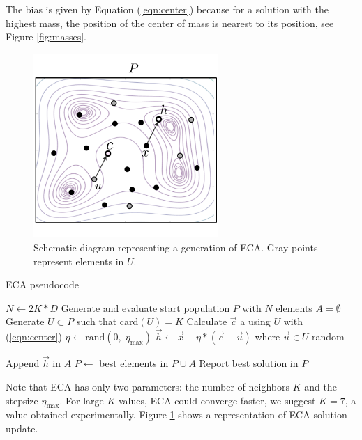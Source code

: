 \documentclass[graybox]{svmult}
\begin{document}
\begin{note}
The bias is given by Equation (\ref{eqn:center}) because for a solution 
with the highest mass, the position of the center of mass is nearest to 
its position, see Figure \ref{fig:masses}.
\end{note}

\begin{figure}[!ht]
	\sidecaption
	\includegraphics[width=7cm]{img/ecaG.pdf}
	\caption{Schematic diagram representing a generation of ECA. Gray points 
	represent elements in $U$.}
	\label{fig:ecag}       %
\end{figure}

\begin{algorithm}[!ht]
	\caption{ECA pseudocode}
	\label{algoritmoEca}
	\begin{algorithmic}[1]
		\State $N \gets 2K * D$
		\State Generate and evaluate start population $P$ with $N$ elements
			\State $A = \emptyset$
				\State Generate $U \subset P$ such that  card$(U) = K$
				\State Calculate $\vec{c}$ a using $U$ with (\ref{eqn:center})
				\State $\eta \gets \text{rand}(0,\; \eta_{\max}) $ 
				\State $\vec{h} \gets \vec{x} + \eta  * (\vec{c} - \vec{u}) $ where $ \vec{u} \in U $ random
				
					\State Append $\vec{h} $ in $A$
				\EndIf
			\EndFor
			\State $P \gets $ best elements in $P \cup A$
		\EndWhile
		\State Report best solution in $P$
		\EndProcedure
	\end{algorithmic}
\end{algorithm}

Note that ECA  has only two parameters: the number of neighbors $K$ and 
the stepsize $\eta_{\max}$.  For large $K$ values, ECA could converge 
faster, we suggest $K = 7$, a value obtained experimentally. Figure \ref{fig:ecag} 
shows a representation of ECA solution update. 
\end{document}
